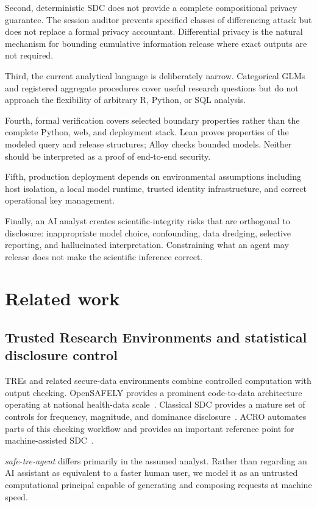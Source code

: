 \documentclass[11pt,a4paper]{article}
\begin{document}
Second, deterministic SDC does not provide a complete compositional privacy
guarantee. The session auditor prevents specified classes of differencing
attack but does not replace a formal privacy accountant. Differential privacy
is the natural mechanism for bounding cumulative information release where
exact outputs are not required.

Third, the current analytical language is deliberately narrow. Categorical
GLMs and registered aggregate procedures cover useful research questions but do
not approach the flexibility of arbitrary R, Python, or SQL analysis.

Fourth, formal verification covers selected boundary properties rather than the
complete Python, web, and deployment stack. Lean proves properties of the
modeled query and release structures; Alloy checks bounded models. Neither
should be interpreted as a proof of end-to-end security.

Fifth, production deployment depends on environmental assumptions including host
isolation, a local model runtime, trusted identity infrastructure, and correct
operational key management.

Finally, an AI analyst creates scientific-integrity risks that are orthogonal to
disclosure: inappropriate model choice, confounding, data dredging, selective
reporting, and hallucinated interpretation. Constraining what an agent may
release does not make the scientific inference correct.

\section{Related work}
\label{sec:related}

\subsection{Trusted Research Environments and statistical disclosure control}

TREs and related secure-data environments combine controlled computation with
output checking. OpenSAFELY provides a prominent code-to-data architecture
operating at national health-data scale~\cite{opensafely2020}. Classical SDC
provides a mature set of controls for frequency, magnitude, and dominance
disclosure~\cite{hundepool2012}. ACRO automates parts of this checking workflow
and provides an important reference point for machine-assisted SDC~\cite{acro}.

\textit{safe-tre-agent} differs primarily in the assumed analyst. Rather than
regarding an AI assistant as equivalent to a faster human user, we model it as
an untrusted computational principal capable of generating and composing
requests at machine speed.
\end{document}
